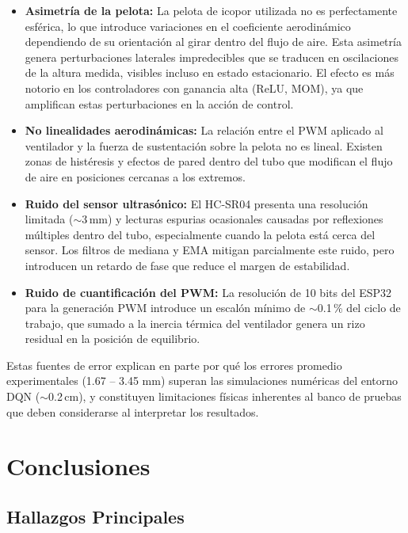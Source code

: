 \documentclass[conference]{IEEEtran}
\begin{document}
\begin{itemize}
    \item \textbf{Asimetría de la pelota:} La pelota de icopor utilizada no es perfectamente esférica, lo que introduce variaciones en el coeficiente aerodinámico dependiendo de su orientación al girar dentro del flujo de aire. Esta asimetría genera perturbaciones laterales impredecibles que se traducen en oscilaciones de la altura medida, visibles incluso en estado estacionario. El efecto es más notorio en los controladores con ganancia alta (ReLU, MOM), ya que amplifican estas perturbaciones en la acción de control.
    
    \item \textbf{No linealidades aerodinámicas:} La relación entre el PWM aplicado al ventilador y la fuerza de sustentación sobre la pelota no es lineal. Existen zonas de histéresis y efectos de pared dentro del tubo que modifican el flujo de aire en posiciones cercanas a los extremos.
    
    \item \textbf{Ruido del sensor ultrasónico:} El HC-SR04 presenta una resolución limitada ($\sim$3\,mm) y lecturas espurias ocasionales causadas por reflexiones múltiples dentro del tubo, especialmente cuando la pelota está cerca del sensor. Los filtros de mediana y EMA mitigan parcialmente este ruido, pero introducen un retardo de fase que reduce el margen de estabilidad.
    
    \item \textbf{Ruido de cuantificación del PWM:} La resolución de 10 bits del ESP32 para la generación PWM introduce un escalón mínimo de $\sim$0.1\,\% del ciclo de trabajo, que sumado a la inercia térmica del ventilador genera un rizo residual en la posición de equilibrio.
\end{itemize}

Estas fuentes de error explican en parte por qué los errores promedio experimentales (1.67 -- 3.45 mm) superan las simulaciones numéricas del entorno DQN ($\sim$0.2\,cm), y constituyen limitaciones físicas inherentes al banco de pruebas que deben considerarse al interpretar los resultados.

\section{Conclusiones}

\subsection{Hallazgos Principales}
\end{document}
